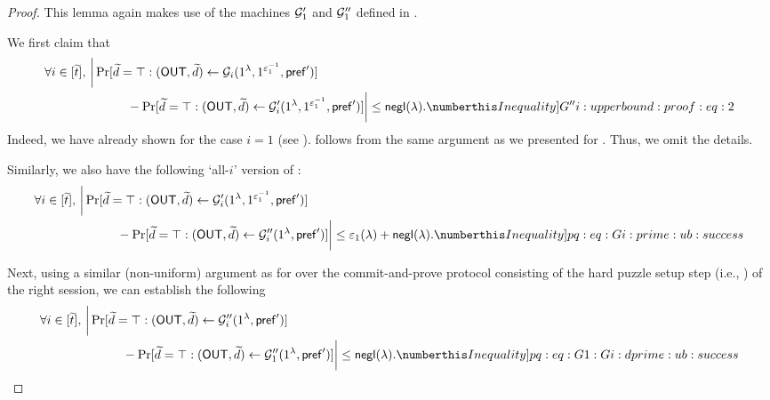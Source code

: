 \begin{proof} 

This lemma again makes use of the machines $\mathcal{G}_1'$ and $\mathcal{G}_1''$ defined in  .

We first claim that
\begin{align*}
\forall i \in [\tilde{t}],~ & \bigg|\Pr[\tilde{d} = \top : (\OUT,\tilde{d}) \gets \mcal{G}_i{(1^\secpar, 1^{\epsilon_1^{-1}},  \msf{pref}')}] \\
&\hspace{3em} - \Pr[\tilde{d} = \top : (\OUT,\tilde{d}) \gets \mcal{G}_i'{(1^\secpar, 1^{\epsilon_1^{-1}},  \msf{pref}')}]\bigg| \leq \negl(\secpar). \numberthis \label[Inequality]{G''i:upperbound:proof:eq:2}
\end{align*} 
Indeed, we have already shown  for the case $i = 1$ (see ).  follows from the same argument as we presented for . Thus, we omit the details.

Similarly, we also have the following `all-$i$' version of :
\begin{align*}
 \forall i \in [\tilde{t}],~& \bigg|\Pr[\tilde{d} = \top : (\OUT,\tilde{d}) \gets \mcal{G}'_i{(1^\secpar, 1^{\epsilon_1^{-1}},  \msf{pref}')}] \\
&\hspace{3em} - \Pr[\tilde{d} = \top : (\OUT,\tilde{d}) \gets \mcal{G}_i''{(1^\secpar,  \msf{pref}')}]\bigg| \leq \epsilon_1(\secpar)  + \negl(\secpar). \numberthis \label[Inequality]{pq:eq:Gi:prime:ub:success}
\end{align*} 

Next, using a similar (non-uniform) argument as for  over the commit-and-prove protocol consisting of the hard puzzle setup step (i.e., ) of the right session, we can establish the following
\begin{align*}
 \forall i \in [\tilde{t}],~& \bigg|\Pr[\tilde{d} = \top : (\OUT,\tilde{d}) \gets \mcal{G}''_i{(1^\secpar,  \msf{pref}')}] \\
&\hspace{3em} - \Pr[\tilde{d} = \top : (\OUT,\tilde{d}) \gets \mcal{G}_1''{(1^\secpar,  \msf{pref}')}]\bigg| \leq \negl(\secpar). \numberthis \label[Inequality]{pq:eq:G1:Gi:dprime:ub:success}
\end{align*}


\end{proof}
